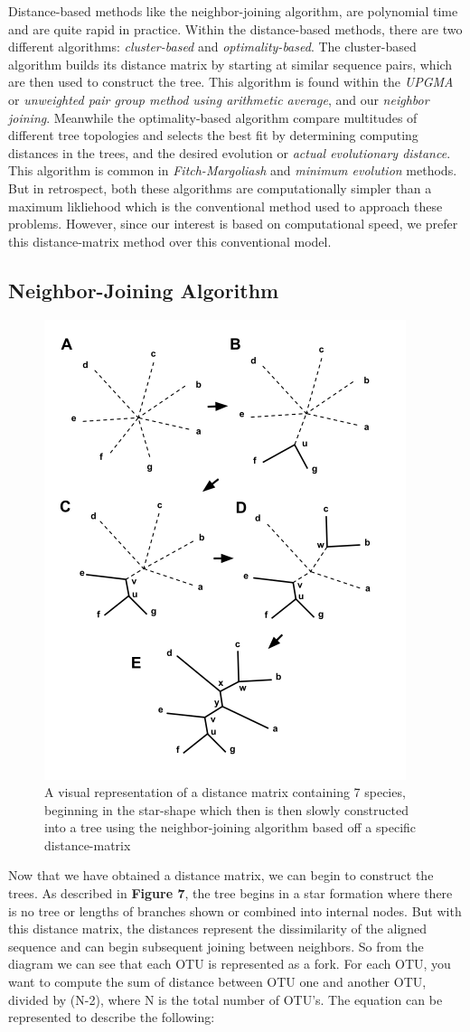 Distance-based methods like the neighbor-joining algorithm, are polynomial time and are quite rapid in practice. 
Within the distance-based methods, there are two different algorithms: \emph{cluster-based} and \emph{optimality-based}. 
The cluster-based algorithm builds its distance matrix by starting at similar sequence pairs, which are then used to construct the tree. 
This algorithm is found within the \emph{UPGMA} or \emph{unweighted pair group method using arithmetic average}, and our \emph{neighbor joining}. 
Meanwhile the optimality-based algorithm compare multitudes of different tree topologies and selects the best fit by determining computing distances in the trees, and the desired evolution or \emph{actual evolutionary distance}. 
This algorithm is common in \emph{Fitch-Margoliash} and \emph{minimum evolution} methods. 
But in retrospect, both these algorithms are computationally simpler than a maximum likliehood which is the conventional method used to approach these problems.
However, since our interest is based on computational speed, we prefer this distance-matrix method over this conventional model.  

\subsection{Neighbor-Joining Algorithm}

\begin{figure}[h!]
\centering
\includegraphics[width=.35\textwidth]{figures/nj.png}
\caption{A visual representation of a distance matrix containing 7 species, beginning in the star-shape which then is then slowly constructed into a tree using the neighbor-joining algorithm based off a specific distance-matrix}
\end{figure}

Now that we have obtained a distance matrix, we can begin to construct the trees. As described in \textbf{Figure 7}, the tree begins in a star formation where there is no tree or lengths of branches shown or combined into internal nodes. But with this distance matrix, the distances represent the dissimilarity of the aligned sequence and can begin subsequent joining between neighbors. So from the diagram we can see that each OTU is represented as a fork. For each OTU, you want to compute the sum of distance between OTU one and another OTU, divided by (N-2), where N is the total number of OTU's. The equation can be represented to describe the following: 

